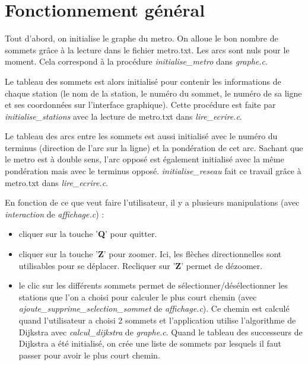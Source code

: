 \documentclass[a4]{article}
\begin{document}
\section{Fonctionnement général}
Tout d'abord, on initialise le graphe du metro. On alloue le bon nombre de sommets grâce 
à la lecture dans le fichier metro.txt. Les arcs sont nuls pour le moment. 
Cela correspond à la procédure \emph{initialise\_metro} dans \textit{graphe.c}.\newline

Le tableau des sommets est alors initialisé pour contenir les informations de chaque station 
(le nom de la station, le numéro du sommet, le numéro de sa ligne et ses coordonnées sur l'interface graphique).
Cette procédure est faite par \emph{initialise\_stations} avec la lecture de metro.txt dans \textit{lire\_ecrire.c}. \newline

Le tableau des arcs entre les sommets est aussi initialisé avec le numéro du terminus (direction de l'arc sur la ligne) 
et la pondération de cet arc. Sachant que le metro est à double sens, l'arc opposé est également initialisé avec la même pondération 
mais avec le terminus opposé. \emph{initialise\_reseau} fait ce travail grâce à metro.txt dans \textit{lire\_ecrire.c}.\newline

En fonction de ce que veut faire l'utilisateur, il y a plusieurs manipulations (avec \emph{interaction} de \textit{affichage.c}) : 
\begin{itemize}
\item cliquer sur la touche '\textbf{Q}' pour quitter.
\item cliquer sur la touche '\textbf{Z}' pour zoomer. Ici, les flèches directionnelles sont utilisables pour se déplacer. 
Recliquer sur '\textbf{Z}' permet de dézoomer. 
\item le clic sur les différents sommets permet de sélectionner/désélectionner 
les stations que l'on a choisi pour calculer le plus court chemin (avec \emph{ajoute\_supprime\_selection\_sommet} de \textit{affichage.c}). Ce chemin est calculé 
quand l'utilisateur a choisi 2 sommets et l'application utilise l'algorithme de Dijkstra avec \emph{calcul\_dijkstra} de \textit{graphe.c}. 
Quand le tableau des successeurs de Dijkstra a été initialisé, on crée une liste de sommets par lesquels il 
faut passer pour avoir le plus court chemin. \newline
\end{itemize}
\end{document}
